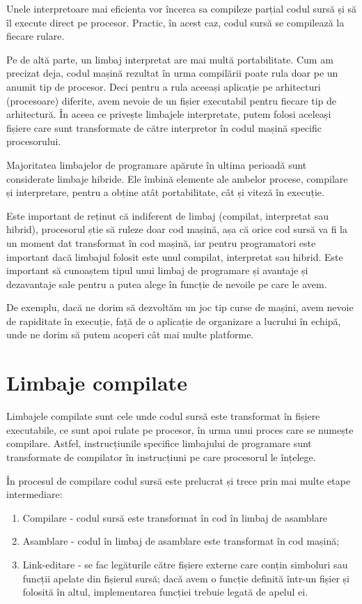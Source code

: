 Unele interpretoare mai eficienta vor încerca sa compileze parțial codul sursă
și să îl execute direct pe procesor. Practic, în acest caz, codul sursă se
compilează la fiecare rulare.

Pe de altă parte, un limbaj interpretat are mai multă portabilitate. Cum am
precizat deja, codul mașină rezultat în urma compilării poate rula doar pe un
anumit tip de procesor. Deci pentru a rula aceeași aplicație pe arhitecturi
(procesoare) diferite, avem nevoie de un fișier executabil pentru fiecare tip de
arhitectură. În aceea ce privește limbajele interpretate, putem folosi aceleași
fișiere care sunt transformate de către interpretor în codul mașină specific
procesorului.

Majoritatea limbajelor de programare apărute în ultima perioadă sunt considerate
limbaje hibride. Ele îmbină elemente ale ambelor procese, compilare și
interpretare, pentru a obține atât portabilitate, cât și viteză în execuție.

Este important de reținut că indiferent de limbaj (compilat, interpretat sau
hibrid), procesorul știe să ruleze doar cod mașină, așa că orice cod sursă va fi
la un moment dat transformat în cod mașină, iar pentru programatori este
important dacă limbajul folosit este unul compilat, interpretat sau hibrid. Este
important să cunoaștem tipul unui limbaj de programare și avantaje și
dezavantaje sale pentru a putea alege în funcție de nevoile pe care le avem.

De exemplu, dacă ne dorim să dezvoltăm un joc tip curse de mașini, avem nevoie
de rapiditate în execuție, față de o aplicație de organizare a lucrului în
echipă, unde ne dorim să putem acoperi cât mai multe platforme.

\section{Limbaje compilate}
\label{sec:appdev-langs-comp}

Limbajele compilate sunt cele unde codul sursă este transformat în fișiere
executabile, ce sunt apoi rulate pe procesor, în urma unui proces care se
numește compilare. Astfel, instrucțiunile specifice limbajului de programare
sunt transformate de compilator în instrucțiuni pe care procesorul le înțelege.

În procesul de compilare codul sursă este prelucrat și trece prin mai multe
etape intermediare:

\begin{enumerate}
	\item Compilare - codul sursă este transformat în cod în limbaj de
		asamblare
	\item Asamblare - codul în limbaj de asamblare este transformat în cod
		mașină;
	\item Link-editare - se fac legăturile către fișiere externe care conțin
		simboluri sau funcții apelate din fișierul sursă; dacă avem o
		funcție definită într-un fișier și folosită în altul,
		implementarea funcției trebuie legată de apelul ei.
\end{enumerate}

